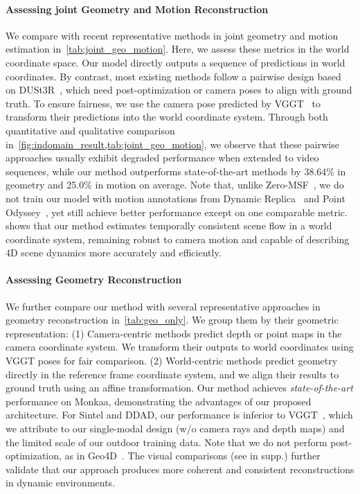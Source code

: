 \paragraph{Assessing joint Geometry and Motion Reconstruction}
We compare \method with recent representative methods in joint geometry and motion estimation in~\cref{tab:joint_geo_motion}.
Here,
we assess these metrics in the world coordinate space.
Our model directly outputs a sequence of predictions in world coordinates.
By contrast, most existing methods follow a pairwise design based on DUSt3R~\cite{wang2024dust3r},
which need post-optimization or camera poses to align with ground truth.
To ensure fairness, we use the camera pose predicted by VGGT~\cite{wang2025vggt} to transform their predictions into the world coordinate system.
% 
Through both quantitative and qualitative comparison in~\cref{fig:indomain_result,tab:joint_geo_motion},
we observe that these pairwise approaches usually exhibit degraded performance when extended to video sequences, while our method outperforms state-of-the-art methods by 38.64\% in geometry and 25.0\% in motion on average.
Note that,
unlike Zero-MSF~\cite{liang2025zero},
we do not train our model with motion annotations from Dynamic Replica~\cite{karaev2023dynamicstereo} and Point Odyssey~\cite{zheng2023pointodyssey}, yet still achieve better performance except on one comparable metric.
 shows that our method estimates temporally consistent scene flow in a world coordinate system, 
remaining robust to camera motion and capable of describing 4D scene dynamics more accurately and efficiently.




\paragraph{Assessing Geometry Reconstruction}
We further compare our method with several representative approaches in geometry reconstruction in~\cref{tab:geo_only}.
We group them by their geometric representation:
(1) Camera-centric methods predict depth or point maps in the camera coordinate system.
We transform their outputs to world coordinates using VGGT poses for fair comparison.
(2) World-centric methods predict geometry directly in the reference frame coordinate system, and we align their results to ground truth using an affine transformation.
% 
Our method achieves \emph{state-of-the-art} performance on Monkaa, 
demonstrating the advantages of our proposed architecture. 
For Sintel and DDAD, our performance is inferior to VGGT~\cite{wang2025vggt}, 
which we attribute to our single-modal design (w/o camera rays and depth maps) and the limited scale of our outdoor training data. 
Note that we do not perform post-optimization, as in Geo4D~\cite{jiang2025geo4d}.
The visual comparisons (see in supp.) further validate that our approach produces more coherent and consistent reconstructions in dynamic environments.

